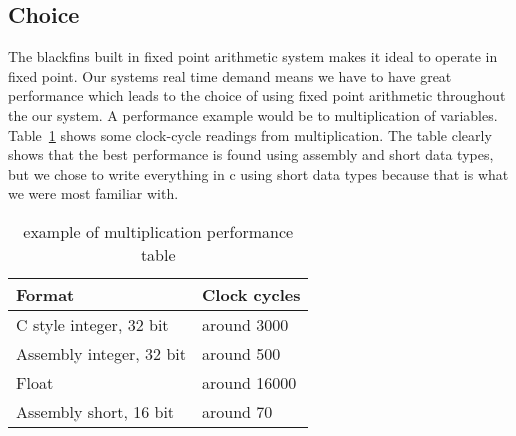 \subsection{Choice}
The blackfins built in fixed point arithmetic system makes it ideal to operate in fixed point. Our systems real time demand means we have to have great performance which leads to the choice of using fixed point arithmetic throughout the our system. A performance example would be to multiplication of variables. Table~\ref{tab:performance} shows some clock-cycle readings from multiplication. The table clearly shows that the best performance is found using assembly and short data types, but we chose to write everything in c using short data types because that is what we were most familiar with.
\begin{table}[hbtp]
	\centering
    \begin{tabular}{| p{4.5cm} | p{2.5cm} |}
    \hline
    Format                   & Clock cycles \\ \hline
    C style integer, 32 bit  & around 3000  \\ \hline
    Assembly integer, 32 bit & around 500   \\ \hline
    Float                    & around 16000 \\ \hline
    Assembly short, 16 bit   & around 70    \\ \hline
    \end{tabular}
    \caption{example of multiplication performance table}
    \label{tab:performance}
\end{table}